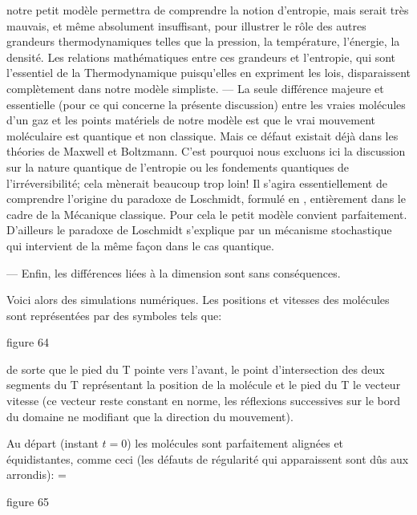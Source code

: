notre petit mod\`ele permettra de comprendre la notion d'entropie, mais 
serait tr\`es mauvais, et m\^eme absolument insuffisant, pour illustrer 
le r\^ole des autres grandeurs thermodynamiques telles que la pression, 
la temp\'erature, l'\'energie, la densit\'e. Les relations math\'ematiques 
entre ces grandeurs et l'entropie, qui sont l'essentiel de la 
Thermodynamique puisqu'elles en expriment les lois, disparaissent
compl\`etement dans notre mod\`ele simpliste.
\medskip
--- La seule diff\'erence majeure et essentielle (pour ce qui concerne 
la pr\'esente discussion) entre les vraies mol\'ecules d'un gaz et 
les points mat\'eriels de notre mod\`ele est que le vrai mouvement 
mol\'eculaire est quantique et non classique. Mais ce d\'efaut existait
d\'ej\`a dans les th\'eories de Maxwell et Boltzmann. 
C'est pourquoi nous excluons ici la discussion sur la nature quantique de l'entropie ou 
les fondements quantiques de l'irr\'eversibilit\'e; cela m\`enerait 
beaucoup trop loin! Il s'agira essentiellement de comprendre l'origine 
du paradoxe de Loschmidt, formul\'e en {}, enti\`erement dans 
le cadre de la M\'ecanique classique. Pour cela le petit mod\`ele convient 
parfaitement. D'ailleurs le paradoxe de Loschmidt s'explique par un 
m\'ecanisme stochastique qui intervient de la m\^eme fa\c{c}on dans 
le cas quantique.
\medskip

--- Enfin, les diff\'erences li\'ees \`a la dimension sont sans 
cons\'equences.

\bigskip

Voici alors des simulations num\'eriques. Les positions et vitesses des
mol\'ecules sont repr\'esent\'ees par des symboles tels que:
\medskip


\centerline{}\centerline{\eightrm figure 64}
\medskip


\noindent de sorte que le pied du T pointe vers l'avant, le point
d'intersection des deux segments du T repr\'esentant la position de la
mol\'ecule et le pied du T le vecteur vitesse (ce vecteur reste constant
en norme, les r\'eflexions successives sur le bord du domaine ne modifiant
que la direction du mouvement).
\medskip

Au d\'epart (instant $t=0$) les mol\'ecules sont parfaitement align\'ees
et \'equidistantes, comme ceci (les d\'efauts de r\'egularit\'e qui
apparaissent
sont d\^us aux arrondis):
\medskip
\epsfxsize=\hsize
\centerline{}\centerline{\eightrm figure 65}
\medskip

